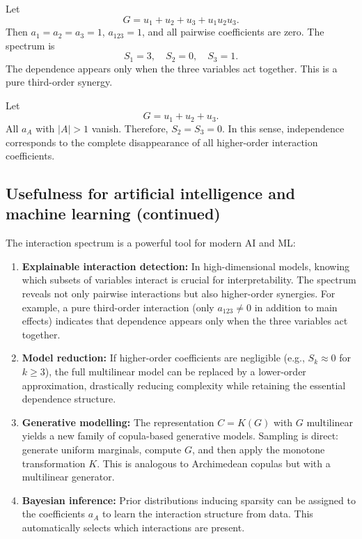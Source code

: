 \begin{example}
Let
\[
G = u_1+u_2+u_3 + u_1u_2u_3.
\]
Then \(a_1=a_2=a_3=1\), \(a_{123}=1\), and all pairwise coefficients are zero. The spectrum is
\[
S_1=3,\quad S_2=0,\quad S_3=1.
\]
The dependence appears only when the three variables act together. This is a pure third-order synergy.
\end{example}

\begin{example}[Independence]
Let
\[
G = u_1+u_2+u_3.
\]
All \(a_A\) with \(|A|>1\) vanish. Therefore, \(S_2=S_3=0\). In this sense, independence corresponds to the complete disappearance of all higher-order interaction coefficients.
\end{example}

\subsection{Usefulness for artificial intelligence and machine learning (continued)}

The interaction spectrum is a powerful tool for modern AI and ML:

\begin{enumerate}
    \item \textbf{Explainable interaction detection:} In high-dimensional models, knowing which subsets of variables interact is crucial for interpretability. The spectrum reveals not only pairwise interactions but also higher-order synergies. For example, a pure third-order interaction (only \(a_{123}\neq0\) in addition to main effects) indicates that dependence appears only when the three variables act together.

    \item \textbf{Model reduction:} If higher-order coefficients are negligible (e.g., \(S_k \approx 0\) for \(k\ge 3\)), the full multilinear model can be replaced by a lower-order approximation, drastically reducing complexity while retaining the essential dependence structure.

    \item \textbf{Generative modelling:} The representation \(C = K(G)\) with \(G\) multilinear yields a new family of copula-based generative models. Sampling is direct: generate uniform marginals, compute \(G\), and then apply the monotone transformation \(K\). This is analogous to Archimedean copulas but with a multilinear generator.

    \item \textbf{Bayesian inference:} Prior distributions inducing sparsity can be assigned to the coefficients \(a_A\) to learn the interaction structure from data. This automatically selects which interactions are present.
\end{enumerate}


